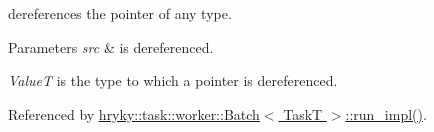 dereferences the pointer of any type. 


\begin{DoxyParams}{Parameters}
{\em src} & is dereferenced.\\
\hline
\end{DoxyParams}

\begin{DoxyItemize}
\item {\itshape Value\-T\/} is the type to which a pointer is dereferenced. 
\end{DoxyItemize}

Referenced by \hyperlink{group__task_ga1f7366c2252fb0c7a7c8dc6f92a31e88}{hryky\-::task\-::worker\-::\-Batch$<$ Task\-T $>$\-::run\-\_\-impl()}.

